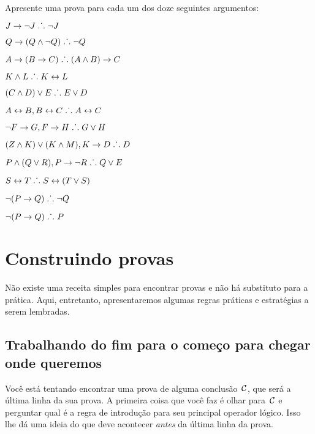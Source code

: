 \solutions
\problempart
\label{pr.solvedTFLproofs}
Apresente uma prova para cada um dos doze seguintes argumentos:
\begin{earg}
\item $J\rightarrow\neg J \mathrel{\ldotp\dot{}\,\ldotp} \neg J$
\item $Q\rightarrow(Q\wedge\neg Q) \mathrel{\ldotp\dot{}\,\ldotp} \neg Q$
\item $A\rightarrow (B\rightarrow C) \mathrel{\ldotp\dot{}\,\ldotp} (A\wedge B)\rightarrow C$
\item $K\wedge L \mathrel{\ldotp\dot{}\,\ldotp} K\leftrightarrow L$
\item $(C\wedge D)\vee E \mathrel{\ldotp\dot{}\,\ldotp} E\vee D$
\item $A\leftrightarrow B, B\leftrightarrow C \mathrel{\ldotp\dot{}\,\ldotp} A\leftrightarrow C$
\item $\neg F\rightarrow G, F\rightarrow H \mathrel{\ldotp\dot{}\,\ldotp} G\vee H$
\item $(Z\wedge K) \vee (K\wedge M), K \rightarrow D \mathrel{\ldotp\dot{}\,\ldotp} D$
\item $P \wedge (Q\vee R), P\rightarrow \neg R \mathrel{\ldotp\dot{}\,\ldotp} Q\vee E$
\item $S\leftrightarrow T \mathrel{\ldotp\dot{}\,\ldotp} S\leftrightarrow (T\vee S)$
\item $\neg (P \rightarrow Q) \mathrel{\ldotp\dot{}\,\ldotp} \neg Q$
\item $\neg (P \rightarrow Q) \mathrel{\ldotp\dot{}\,\ldotp} P$
\end{earg}


\chapter{Construindo provas}\label{s:stratTFL}

 N\~ao existe uma receita simples para encontrar provas e n\~ao h\'a substituto para a pr\'atica. Aqui, entretanto, apresentaremos algumas regras pr\'aticas e estrat\'egias a serem lembradas.

\section{Trabalhando do fim para o come\c co para chegar onde queremos}

 Voc\^e est\'a tentando encontrar uma prova de alguma conclus\~ao~$\mathcal{C}$, que ser\'a a \'ultima linha da sua prova. A primeira coisa que voc\^e faz \'e olhar para~$\mathcal{C}$ e perguntar qual \'e a regra de introdu\c c\~ao para seu principal operador l\'ogico. Isso lhe d\'a uma ideia do que deve acontecer \emph{antes} da \'ultima linha da prova. 

